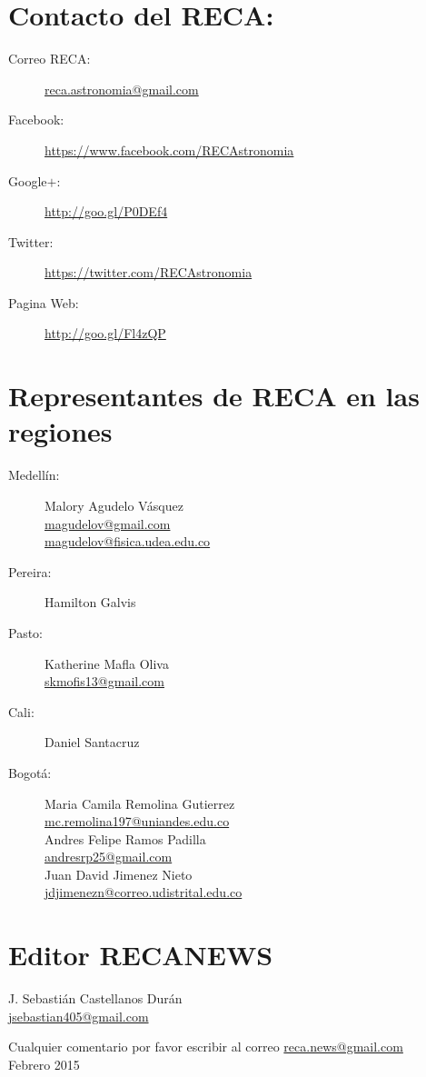 \documentclass{book}
\begin{document}
\section*{Contacto del RECA:}

\begin{description}
\item[Correo RECA:]\url{reca.astronomia@gmail.com}
\item[Facebook:] \url{https://www.facebook.com/RECAstronomia}
\item[Google$+$:] \url{http://goo.gl/P0DEf4}
\item[Twitter:] \url{https://twitter.com/RECAstronomia}
\item[Pagina Web:] \url{http://goo.gl/Fl4zQP}
\end{description}


\section*{Representantes de RECA en las regiones}
\begin{description}
\item[Medellín:]Malory Agudelo Vásquez\\
\url{magudelov@gmail.com}\\ \url{magudelov@fisica.udea.edu.co}
\item[Pereira:]Hamilton Galvis 
\item[Pasto:]Katherine Mafla Oliva\\
\url{skmofis13@gmail.com}
\item[Cali:]Daniel Santacruz
\item[Bogotá:]Maria Camila Remolina Gutierrez\\
\url{mc.remolina197@uniandes.edu.co}\\

Andres Felipe Ramos Padilla\\
\url{andresrp25@gmail.com}\\

Juan David Jimenez Nieto\\
\url{jdjimenezn@correo.udistrital.edu.co}
\end{description}


			\section*{Editor RECANEWS}
    
\begin{flushright}
J. Sebastián Castellanos Durán\\
\url{jsebastian405@gmail.com}
\end{flushright}
\begin{flushright}
Cualquier comentario por favor escribir al correo  \url{reca.news@gmail.com}\\
Febrero 2015
\end{flushright}
\end{document}
